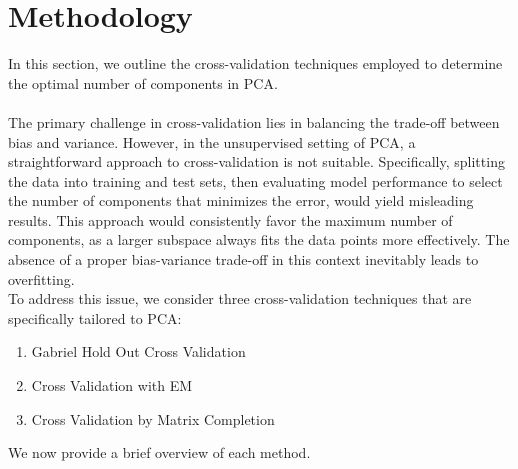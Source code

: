 \documentclass{article}
\begin{document}
\section{Methodology}
In this section, we outline the cross-validation techniques employed to determine the optimal number of components in PCA. \\ \\
The primary challenge in cross-validation lies in balancing the trade-off between bias and variance. However, in the unsupervised setting of PCA,  
a straightforward approach to cross-validation is not suitable. Specifically, splitting the data into training and test sets, then evaluating model performance 
to select the number of components that minimizes the error, would yield misleading results. This approach would consistently favor the maximum number of components, 
as a larger subspace always fits the data points more effectively. The absence of a proper bias-variance trade-off in this context inevitably leads to overfitting. \\  
To address this issue, we consider three cross-validation techniques that are specifically tailored to PCA:
\begin{enumerate}[label=(\alph*)] 
    \item Gabriel Hold Out Cross Validation
    \item Cross Validation with EM
    \item Cross Validation by Matrix Completion
\end{enumerate}
We now provide a brief overview of each method.
\end{document}
